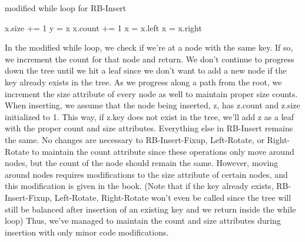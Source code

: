 \documentclass[11pt,a4paper]{article}
\begin{document}
\begin{algorithm}
\caption{modified while loop for RB-Insert}
\begin{algorithmic}
	\State x.size += 1
	\State y = x
		\State x.count += 1
		\State \Return
		\State x = x.left
	\Else 
		\State x = x.right
	\EndIf
\EndWhile
\end{algorithmic}
\end{algorithm}

In the modified while loop, we check if we're at a node with the same key. If so, we increment the count for that node and return. We don't continue to progress down the tree until we hit a leaf since we don't want to add a new node if the key already exists in the tree. As we progress along a path from the root, we increment the size attribute of every node as well to maintain proper size counts. When inserting, we assume that the node being inserted, z, has z.count and z.size initialized to 1. This way, if z.key does not exist in the tree, we'll add z as a leaf with the proper count and size attributes. Everything else in RB-Insert remains the same. No changes are necessary to RB-Insert-Fixup, Left-Rotate, or Right-Rotate to maintain the count attribute since these operations only move around nodes, but the count of the node should remain the same. However, moving around nodes requires modifications to the size attribute of certain nodes, and this modification is given in the book. (Note that if the key already exists, RB-Insert-Fixup, Left-Rotate, Right-Rotate won't even be called since the tree will still be balanced after insertion of an existing key and we return inside the while loop) Thus, we've managed to maintain the count and size attributes during insertion with only minor code modifications.
\end{document}

